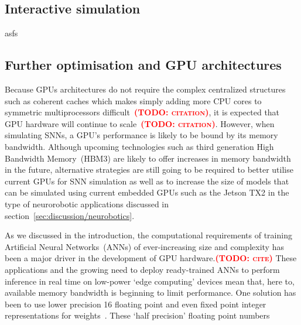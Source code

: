 \documentclass[utf8]{frontiersSCNS} %
\newcommand{\todo}[1]{\textbf{\textsc{\textcolor{red}{(TODO: #1)}}}}
\begin{document}
\subsection{Interactive simulation}
asfs

\subsection{Further optimisation and GPU architectures}
Because GPUs architectures do not require the complex centralized structures such as coherent caches which makes simply adding more CPU cores to symmetric multiprocessors difficult~\todo{citation}, it is expected that GPU hardware will continue to scale~\todo{citation}.
However, when simulating SNNs, a GPU's performance is likely to be bound by its memory bandwidth.
Although upcoming technologies such as third generation High Bandwidth Memory~(HBM3) are likely to offer increases in memory bandwidth in the future, alternative strategies are still going to be required to better utilise current GPUs for SNN simulation as well as to increase the size of models that can be simulated using current embedded GPUs such as the Jetson TX2 in the type of neurorobotic applications discussed in section~\ref{sec:discussion/neurobotics}.

As we discussed in the introduction, the computational requirements of training Artificial Neural Networks~(ANNs) of ever-increasing size and complexity has been a major driver in the development of GPU hardware.\todo{cite}
These applications and the growing need to deploy ready-trained ANNs to perform inference in real time on low-power `edge computing' devices mean that, here to, available memory bandwidth is beginning to limit performance.
One solution has been to use lower precision \SI{16}{\bit} floating point and even fixed point integer representations for weights~\citep{Micikevicius2017}.
These `half precision' floating point numbers 
\end{document}
